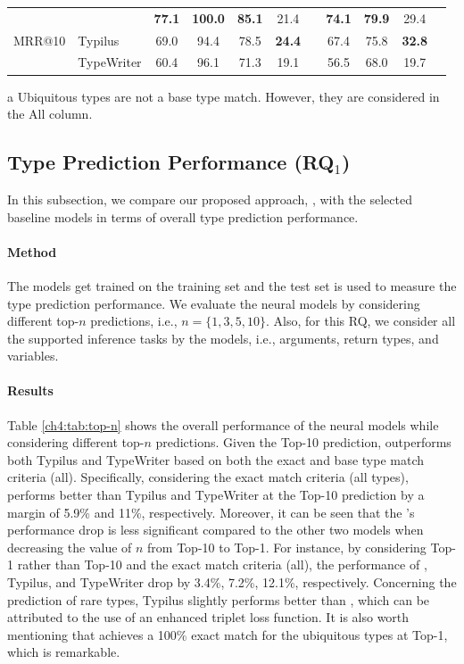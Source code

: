 \begin{table}[!t]
\begin{threeparttable}
{\begin{tabular}{@{}l l c c c c c c c c c @{}}
		\multirow{3}{*}{MRR@10} & \name & \textbf{77.1} & \textbf{100.0} & \textbf{85.1} & 21.4 & & \textbf{74.1} & \textbf{79.9} & 29.4 &  \\
		& Typilus  & 69.0 & 94.4 & 78.5 & \textbf{24.4} & & 67.4 & 75.8 & \textbf{32.8} & \\
		& TypeWriter & 60.4 & 96.1 & 71.3 & 19.1 & & 56.5 & 68.0 & 19.7 & \\
		\bottomrule
	\end{tabular}}
	\begin{tablenotes}
		\item[a] {\footnotesize Ubiquitous types are not a base type match. However, they are considered in the All column.}
	\end{tablenotes}
\end{threeparttable}
\end{table}

\subsection{Type Prediction Performance (\textbf{RQ}$_{1}$)}
\label{ch4:sub:quanti-eval}
In this subsection, we compare our proposed approach, \name, with the selected baseline models in terms of overall type prediction performance.

\paragraph{Method}
The models get trained on the training set and the test set is used to measure the type prediction performance.
We evaluate the neural models by considering different top-$n$ predictions, i.e., $n=\{1,3,5,10\}$.
Also, for this RQ, we consider all the supported inference tasks by the models, i.e., arguments, return types, and variables.

\paragraph{Results}
Table \ref{ch4:tab:top-n} shows the overall performance of the neural models while considering different top-$n$ predictions. Given the Top-10 prediction, \name outperforms both Typilus and TypeWriter based on both the exact and base type match criteria (all). Specifically, considering the exact match criteria (all types), \name performs better than Typilus and TypeWriter at the Top-10 prediction by a margin of 5.9\% and 11\%, respectively. Moreover, it can be seen that the \name's performance drop is less significant compared to the other two models when decreasing the value of $n$ from Top-10 to Top-1. For instance, by considering Top-1 rather than Top-10 and the exact match criteria (all), the performance of \name, Typilus, and TypeWriter drop by 3.4\%, 7.2\%, 12.1\%, respectively. Concerning the prediction of rare types, Typilus slightly performs better than \name, which can be attributed to the use of an enhanced triplet loss function. It is also worth mentioning that \name achieves a 100\% exact match for the ubiquitous types at Top-1, which is remarkable.

